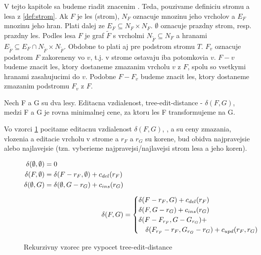 V tejto kapitole sa budeme riadit znacenim \citet{RTED}. Teda, pouzivame definiciu
stromu a lesa z \ref{def:strom}. Ak $F$ je les (strom), $N_F$ oznacuje mnozinu jeho vrcholov a $E_F$
mnozinu jeho hran. Plati dalej ze $E_F \subseteq N_F \times N_F$. $\emptyset$ oznacuje
prazdny strom, resp. prazdny les. Podles lesa $F$ je graf $\tilde{F}$ s vrcholmi
$N_{\tilde{F}} \subseteq N_F$ a hranami $E_{\tilde{F}} \subseteq E_F \cap N_{\tilde{F}} \times N_{\tilde{F}}$.
Obdobne to plati aj pre podstrom stromu $T$.
$F_{v}$ oznacuje podstrom $F$ zakoreneny vo $v$, t.j. v strome ostavaju iba potomkovia $v$.
$F - v$ budeme znacit les, ktory dostaneme zmazanim vrcholu $v$ z $F$, spolu so vsetkymi hranami
zasahujucimi do $v$. Podobne $F - F_{v}$ budeme znacit les, ktory dostaneme zmazanim podstromu
$F_{v}$ z $F$.

\begin{definice}
	Nech F a G su dva lesy. Editacna vzdialenost, tree-edit-distance - $\delta(F, G)$,
	medzi F a G je rovna minimalnej cene, za ktoru les F transformujeme na G.
\end{definice}

Vo vzorci \ref{eq:ted} pocitame editacnu vzdialenost $\delta(F, G)$,
\Cdel, \Cins a \Cupd su ceny zmazania, vlozenia a editacie vrcholu v strome
a $r_{F}$ a $r_{G}$ su korene, bud obidva najpravejsie alebo najlavejsie (tzn. vyberieme
najpravejsi/najlavejsi strom lesa a jeho koren).

\begin{figure}[H]\label{eq:ted}
\begin{subequations}
\begin{align}
	\begin{split}
	\delta(\emptyset, \emptyset) &=
		0
		\\
	\delta(F, \emptyset) &=
		\delta(F - r_{F}, \emptyset) + c_{del}(r_{F})
		\\
	\delta(\emptyset, G) &=
		\delta(\emptyset, G - r_{G}) + c_{ins}(r_{G})
	\end{split}
	\\[1ex]
	\delta(F, G) &=
		\begin{cases}
			\delta(F - r_{F}, G) + c_{del}(r_{F}) \\
			\delta(F, G - r_{G}) + c_{ins}(r_{G}) \\
			\delta(F - F_{r_{F}}, G - G_{r_{G}}) + \\
				\quad \delta(F_{r_{F}} - r_{F}, G_{r_{G}} - r_{G}) + c_{upd}(r_{F}, r_{G})
		\end{cases}
\end{align}
\end{subequations}
\caption{Rekurzivny vzorec pre vypocet tree-edit-distance}
\end{figure}

